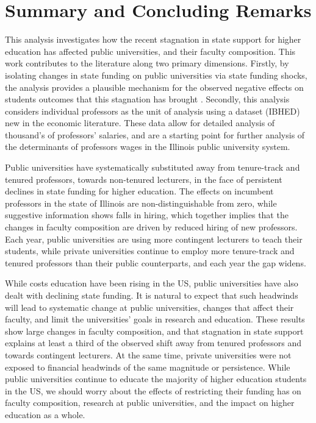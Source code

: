 \section{Summary and Concluding Remarks}
\label{sec:conclusion}

This analysis investigates how the recent stagnation in state support for higher education has affected public universities, and their faculty composition.
This work contributes to the literature along two primary dimensions.
Firstly, by isolating changes in state funding on public universities via state funding shocks, the analysis provides a plausible mechanism for the observed negative effects on students outcomes that this stagnation has brought \citep{NBERw23736,NBERw27885}.
Secondly, this analysis considers individual professors as the unit of analysis using a dataset (IBHED) new in the economic literature.
These data allow for detailed analysis of thousand's of professors' salaries, and are a starting point for further analysis of the determinants of professors wages in the Illinois public university system.

Public universities have systematically substituted away from tenure-track and tenured professors, towards non-tenured lecturers, in the face of persistent declines in state funding for higher education.
The effects on incumbent professors in the state of Illinois are non-distinguishable from zero, while suggestive information shows falls in hiring, which together implies that the changes in faculty composition are driven by reduced hiring of new professors.
Each year, public universities are using more contingent lecturers to teach their students, while private universities continue to employ more tenure-track and tenured professors than their public counterparts, and each year the gap widens.

While costs education have been rising in the US, public universities have also dealt with declining state funding.
It is natural to expect that such headwinds will lead to systematic change at public universities, changes that affect their faculty, and limit the universities' goals in research and education.
These results show large changes in faculty composition, and that stagnation in state support explains at least a third of the observed shift away from tenured professors and towards contingent lecturers.
At the same time, private universities were not exposed to financial headwinds of the same magnitude or persistence.
While public universities continue to educate the majority of higher education students in the US, we should worry about the effects of restricting their funding has on faculty composition, research at public universities, and the impact on higher education as a whole.
